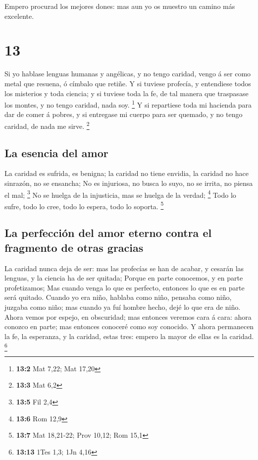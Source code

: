  Empero procurad los mejores dones: mas aun yo os muestro
un camino más excelente.

\hypertarget{section-12}{%
\section{13}\label{section-12}}

 Si yo hablase lenguas humanas y angélicas, y no tengo
caridad, vengo á ser como metal que resuena, ó címbalo que retiñe.
 Y si tuviese profecía, y entendiese todos los misterios y
toda ciencia; y si tuviese toda la fe, de tal manera que traspasase los
montes, y no tengo caridad, nada soy. \footnote{\textbf{13:2} Mat 7,22;
  Mat 17,20}  Y si repartiese toda mi hacienda para dar de
comer á pobres, y si entregase mi cuerpo para ser quemado, y no tengo
caridad, de nada me sirve. \footnote{\textbf{13:3} Mat 6,2}

\hypertarget{la-esencia-del-amor}{%
\subsection{La esencia del amor}\label{la-esencia-del-amor}}

 La caridad es sufrida, es benigna; la caridad no tiene
envidia, la caridad no hace sinrazón, no se ensancha;  No es
injuriosa, no busca lo suyo, no se irrita, no piensa el mal; \footnote{\textbf{13:5}
  Fil 2,4}  No se huelga de la injusticia, mas se huelga de
la verdad; \footnote{\textbf{13:6} Rom 12,9}  Todo lo sufre,
todo lo cree, todo lo espera, todo lo soporta. \footnote{\textbf{13:7}
  Mat 18,21-22; Prov 10,12; Rom 15,1}

\hypertarget{la-perfecciuxf3n-del-amor-eterno-contra-el-fragmento-de-otras-gracias}{%
\subsection{La perfección del amor eterno contra el fragmento de otras
gracias}\label{la-perfecciuxf3n-del-amor-eterno-contra-el-fragmento-de-otras-gracias}}

 La caridad nunca deja de ser: mas las profecías se han de
acabar, y cesarán las lenguas, y la ciencia ha de ser quitada;
 Porque en parte conocemos, y en parte profetizamos;
 Mas cuando venga lo que es perfecto, entonces lo que es en
parte será quitado.  Cuando yo era niño, hablaba como niño,
pensaba como niño, juzgaba como niño; mas cuando ya fuí hombre hecho,
dejé lo que era de niño.  Ahora vemos por espejo, en
obscuridad; mas entonces veremos cara á cara: ahora conozco en parte;
mas entonces conoceré como soy conocido.  Y ahora
permanecen la fe, la esperanza, y la caridad, estas tres: empero la
mayor de ellas es la caridad. \footnote{\textbf{13:13} 1Tes 1,3; 1Jn
  4,16}

